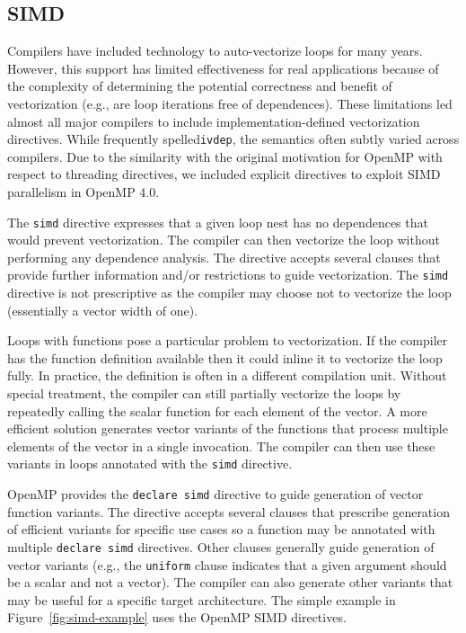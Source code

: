 \subsection{SIMD}
\label{sub:simd}

Compilers have included technology to auto-vectorize loops for many years. 
However, this support has limited effectiveness for real applications because 
of the complexity of determining the potential correctness and benefit of 
vectorization (e.g., are loop iterations free of dependences). These 
limitations led almost all major compilers to include implementation-defined 
vectorization directives. While frequently spelled\texttt{ivdep}, the
semantics often subtly varied across compilers. Due to the similarity 
with the original motivation for OpenMP with respect to threading 
directives, we included explicit directives to exploit SIMD parallelism 
in OpenMP 4.0.

The \texttt{simd} directive expresses that a given loop nest has no
dependences that would prevent vectorization. The compiler can then 
vectorize the loop without performing any dependence analysis. The 
directive accepts several clauses that provide further information 
and/or restrictions to guide vectorization. The \texttt{simd} directive 
is not prescriptive as the compiler may choose not to vectorize the 
loop (essentially a vector width of one).

Loops with functions pose a particular problem to vectorization. If the 
compiler has the function definition available then it could inline it 
to vectorize the loop fully. In practice, the definition is often in a
different compilation unit. Without special treatment, the compiler can
still partially vectorize the loops by repeatedly calling the scalar 
function for each element of the vector. A more efficient solution 
generates vector variants of the functions that process multiple 
elements of the vector in a single invocation. The compiler can then
use these variants in loops annotated with the \texttt{simd} directive.

OpenMP provides the \texttt{declare simd} directive to guide generation
of vector function variants. The directive accepts several clauses that
prescribe generation of efficient variants for specific use cases so a
function may be annotated with multiple \texttt{declare simd} directives.
Other clauses generally guide generation of vector variants (e.g., the 
\texttt{uniform} clause indicates that a given argument should be a 
scalar and not a vector). The compiler can also generate other variants 
that may be useful for a specific target architecture. The simple example 
in Figure~\ref{fig:simd-example} uses the OpenMP SIMD directives.


